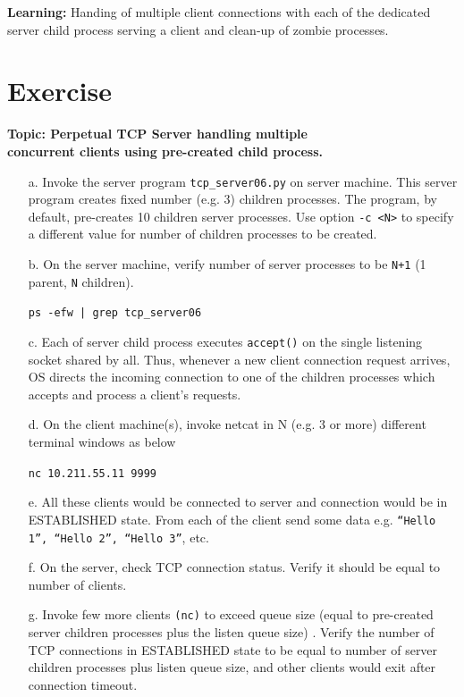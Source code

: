 \begin{multicols}{2}
\begin{itemize}
\end{itemize}

\textbf{Learning:} Handing of multiple client connections with each of the dedicated server child process serving a client and clean-up of zombie processes.

\section*{Exercise \label{chap1-exe04}}

\textbf{Topic:  Perpetual TCP Server handling multiple\\ concurrent clients using pre-created child process.}

\begin{itemize}

\item[a.] Invoke the server program \texttt{tcp\_server06.py} on server machine. This server program creates fixed number (e.g. 3) children processes. The program, by default, pre-creates 10 children server processes. Use option \texttt{-c <N>} to specify a different value for number of children processes to be created.

\item[b.] On the server machine, verify number of server processes to be \texttt{N+1} (1 parent, \texttt{N} children).

\texttt{ps -efw | grep tcp\_server06}

\item[c.] Each of server child process executes \texttt{accept()} on the single listening socket shared by all. Thus, whenever a new client connection request arrives, OS directs the incoming connection to one of the children processes which accepts and process a client’s requests.

\item[d.] On the client machine(s), invoke netcat in N (e.g. 3 or more) different terminal windows as below

\texttt{nc 10.211.55.11 9999}

\item[e.] All these clients would be connected to server and connection would be in ESTABLISHED state. From each of the client send some data e.g. \texttt{“Hello 1”, “Hello 2”, “Hello 3”}, etc.

\item[f.] On the server, check TCP connection status.  Verify it should be equal to number of clients.

\item[g.] Invoke few more clients \texttt{(nc)} to exceed queue size (equal to pre-created server children processes plus the listen queue size) . Verify the number of TCP connections in ESTABLISHED state to be equal to number of server children processes plus listen queue size, and other clients would exit after connection timeout.
\end{itemize}


\end{multicols}
